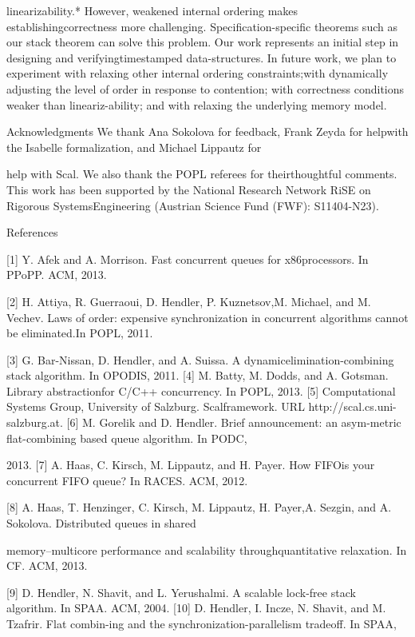 linearizability.*
However, weakened internal ordering makes establishingcorrectness more challenging. Specification-specific theorems such as our stack theorem can solve this problem.
Our work represents an initial step in designing and verifyingtimestamped data-structures. In future work, we plan to experiment with relaxing other internal ordering constraints;with dynamically adjusting the level of order in response to
contention; with correctness conditions weaker than lineariz-ability; and with relaxing the underlying memory model.

Acknowledgments
We thank Ana Sokolova for feedback, Frank Zeyda for helpwith the Isabelle formalization, and Michael Lippautz for

help with Scal. We also thank the POPL referees for theirthoughtful comments. This work has been supported by
the National Research Network RiSE on Rigorous SystemsEngineering (Austrian Science Fund (FWF): S11404-N23).

References

[1] Y. Afek and A. Morrison. Fast concurrent queues for x86processors. In PPoPP. ACM, 2013.

[2] H. Attiya, R. Guerraoui, D. Hendler, P. Kuznetsov,M. Michael, and M. Vechev. Laws of order: expensive synchronization in concurrent algorithms cannot be eliminated.In POPL, 2011.

[3] G. Bar-Nissan, D. Hendler, and A. Suissa. A dynamicelimination-combining stack algorithm. In OPODIS, 2011.
[4] M. Batty, M. Dodds, and A. Gotsman. Library abstractionfor C/C++ concurrency. In POPL, 2013.
[5] Computational Systems Group, University of Salzburg. Scalframework. URL http://scal.cs.uni-salzburg.at.
[6] M. Gorelik and D. Hendler. Brief announcement: an asym-metric flat-combining based queue algorithm. In PODC,

2013.
[7] A. Haas, C. Kirsch, M. Lippautz, and H. Payer. How FIFOis your concurrent FIFO queue? In RACES. ACM, 2012.

[8] A. Haas, T. Henzinger, C. Kirsch, M. Lippautz, H. Payer,A. Sezgin, and A. Sokolova. Distributed queues in shared

memory--multicore performance and scalability throughquantitative relaxation. In CF. ACM, 2013.

[9] D. Hendler, N. Shavit, and L. Yerushalmi. A scalable lock-free stack algorithm. In SPAA. ACM, 2004.
[10] D. Hendler, I. Incze, N. Shavit, and M. Tzafrir. Flat combin-ing and the synchronization-parallelism tradeoff. In SPAA,

